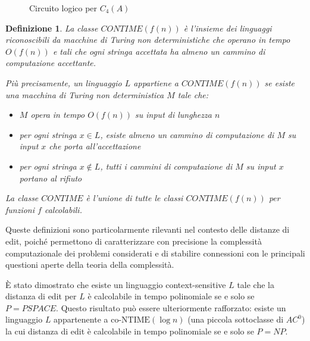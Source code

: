 \documentclass[a4paper,12pt]{report}
\newtheorem{definition}{Definizione}[chapter]
\theoremstyle{propositionstyle}
\begin{document}
\begin{figure}[H]
        \caption{Circuito logico per $C_4(A)$}
        \label{fig:circuito_c4_orizzontale}
    \end{figure}
    \begin{definition}
        La classe $CONTIME(f(n))$ è l'insieme dei linguaggi riconoscibili da macchine di Turing non deterministiche che operano in tempo $O(f(n))$ e tali che ogni stringa accettata ha almeno un cammino di computazione accettante.

        Più precisamente, un linguaggio $L$ appartiene a $CONTIME(f(n))$ se esiste una macchina di Turing non deterministica $M$ tale che:
        \begin{itemize}
            \item $M$ opera in tempo $O(f(n))$ su input di lunghezza $n$
            \item per ogni stringa $x \in L$, esiste almeno un cammino di computazione di $M$ su input $x$ che porta all'accettazione
            \item per ogni stringa $x \notin L$, tutti i cammini di computazione di $M$ su input $x$ portano al rifiuto
        \end{itemize}

        La classe $CONTIME$ è l'unione di tutte le classi $CONTIME(f(n))$ per funzioni $f$ calcolabili.
    \end{definition}

    Queste definizioni sono particolarmente rilevanti nel contesto delle distanze di edit, poiché permettono di caratterizzare con precisione la complessità computazionale dei problemi considerati e di stabilire connessioni con le principali questioni aperte della teoria della complessità.

    È stato dimostrato che esiste un linguaggio context-sensitive $L$ tale che la distanza di edit per $L$ è calcolabile in tempo polinomiale se e solo se $P = PSPACE$. Questo risultato può essere ulteriormente rafforzato: esiste un linguaggio $L$ appartenente a $\text{co-NTIME}(\log n)$ (una piccola sottoclasse di $AC^0$) la cui distanza di edit è calcolabile in tempo polinomiale se e solo se $P = NP$.
\end{document}
